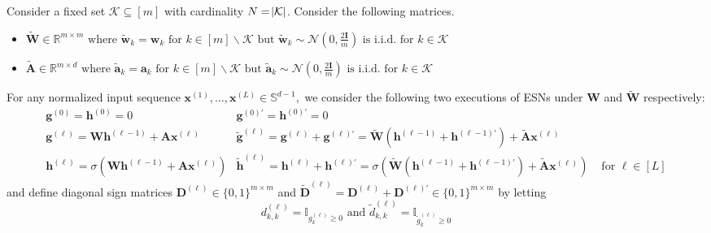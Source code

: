 \begin{lemma}\label{lemma:rerandESN}
	Consider a fixed set $\mathcal{K} \subseteq[m]$ with cardinality $N=\abs{\mathcal{K}}$. Consider the following matrices.
	\begin{itemize}
		\item $\widetilde{\mathbf{W}} \in \mathbb{R}^{m \times m} \text { where } \widetilde{\mathbf{w}}_{k}=\mathbf{w}_{k} \text { for } k \in [m] \backslash \mathcal{K} \text { but } \widetilde{\mathbf{w}}_{k} \sim \mathcal{N}\left(0, \frac{2 \mathbf{I}}{m}\right) \text { is i.i.d. for } k \in \mathcal{K}$
		\item $\widetilde{\mathbf{A}} \in \mathbb{R}^{m \times d} \text { where } \widetilde{\mathbf{a}}_{k}=\mathbf{a}_{k} \text { for } k \in[m] \backslash \mathcal{K} \text { but } \widetilde{\mathbf{a}}_{k} \sim \mathcal{N}\left(0, \frac{2 \mathbf{I}}{m}\right) \text { is i.i.d. for } k \in \mathcal{K}$
	\end{itemize}
	
	For any  normalized input sequence $\mathbf{x}^{(1)}, \ldots, \mathbf{x}^{(L)} \in \mathbb{S}^{d-1},$ we consider the following two executions of ESNs under $\mathbf{W}$ and $\widetilde{\mathbf{W}}$ respectively:
	\[
	\begin{array}{lrl}
		\mathbf{g}^{(0)}=\mathbf{h}^{(0)}=0 & \mathbf{g}^{(0)\prime}=\mathbf{h}^{(0)\prime}=0 \\
		\mathbf{g}^{(\ell)}=\mathbf{W} \mathbf{h}^{(\ell-1)}+\mathbf{A} \mathbf{x}^{(\ell)} & \tilde{\mathbf{g}}^{(\ell)} = \mathbf{g}^{(\ell)}+\mathbf{g}^{(\ell)\prime}=\widetilde{\mathbf{W}}\left(\mathbf{h}^{(\ell-1)}+\mathbf{h}^{(\ell-1)\prime}\right)+\widetilde{\mathbf{A}} \mathbf{x}^{(\ell)} \\
		\mathbf{h}^{(\ell)}=\sigma\left(\mathbf{W} \mathbf{h}^{(\ell-1)}+\mathbf{A} \mathbf{x}^{(\ell)}\right) & \tilde{\mathbf{h}}^{(\ell)} = \mathbf{h}^{(\ell)}+\mathbf{h}^{(\ell)\prime}=\sigma\left(\widetilde{\mathbf{W}}\left(\mathbf{h}^{(\ell-1)}+\mathbf{h}^{(\ell-1)\prime}\right)+\widetilde{\mathbf{A}} \mathbf{x}^{(\ell)}\right) & \text { for } \ell \in [L]
	\end{array}
	\]
	and define diagonal sign matrices $\mathbf{D}^{(\ell)} \in\{0,1\}^{m \times m}$ and $\widetilde{\mathbf{D}}^{(\ell)} = \mathbf{D}^{(\ell)}+\mathbf{D}^{(\ell)\prime} \in\{0,1\}^{m \times m}$ by letting
	$$
	d^{(\ell)}_{k, k}=\mathbb{I}_{g^{(\ell)}_{k} \geq 0} \text { and }\widetilde{d}^{(\ell)}_{k, k}=\mathbb{I}_{\widetilde{g}^{(\ell)}_{k} \geq 0}
	$$
	

\end{lemma}
